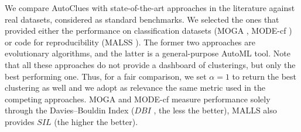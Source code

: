\begin{table}[t]
    \centering
    \caption{Comparison with other approaches in the literature.}
    \label{clustering-tbl:comparison}
\end{table}


We compare AutoClues with state-of-the-art approaches in the literature against real datasets, considered as standard benchmarks.
We selected the ones that provided either the performance on classification datasets (MOGA \cite{dutta2013}, MODE-cf \cite{hancer2020new}) or code for reproducibility (MALSS \cite{Kamoshida2020}).
The former two approaches are evolutionary algorithms, and the latter is a general-purpose AutoML tool.
Note that all these approaches do not provide a dashboard of clusterings, but only the best performing one.
Thus, for a fair comparison, we set $\alpha=1$ to return the best clustering as well and we adopt as relevance the same metric used in the competing approaches.
MOGA and MODE-cf measure performance solely through the Davies–Bouldin Index ($DBI$ \cite{dbi}, the less the better),
MALLS also provides $SIL$ (the higher the better).

